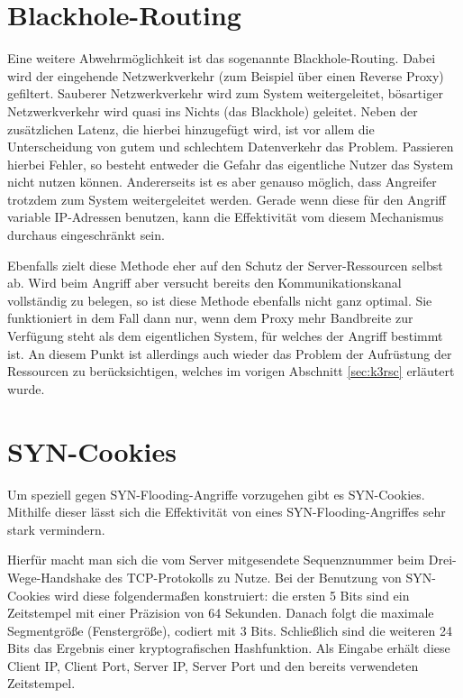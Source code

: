 \section{Blackhole-Routing}
Eine weitere Abwehrmöglichkeit ist das sogenannte Blackhole-Routing. Dabei wird der eingehende Netzwerkverkehr (zum Beispiel über einen Reverse Proxy) gefiltert. \glqq Sauberer\grqq{} Netzwerkverkehr wird zum System weitergeleitet, bösartiger Netzwerkverkehr wird quasi ins Nichts (das Blackhole) geleitet. Neben der zusätzlichen Latenz, die hierbei hinzugefügt wird, ist vor allem die Unterscheidung von gutem und schlechtem Datenverkehr das Problem. Passieren hierbei Fehler, so besteht entweder die Gefahr das eigentliche Nutzer das System nicht nutzen können. Andererseits ist es aber genauso möglich, dass Angreifer trotzdem zum System weitergeleitet werden. Gerade wenn diese für den Angriff variable IP-Adressen benutzen, kann die Effektivität vom diesem Mechanismus durchaus eingeschränkt sein. \cite{CloudflareBlackhole}

Ebenfalls zielt diese Methode eher auf den Schutz der Server-Ressourcen selbst ab. Wird beim Angriff aber versucht bereits den Kommunikationskanal vollständig zu belegen, so ist diese Methode ebenfalls nicht ganz optimal. Sie funktioniert in dem Fall dann nur, wenn dem Proxy mehr Bandbreite zur Verfügung steht als dem eigentlichen System, für welches der Angriff bestimmt ist. An diesem Punkt ist allerdings auch wieder das Problem der Aufrüstung der Ressourcen zu berücksichtigen, welches im vorigen Abschnitt \ref{sec:k3rsc} erläutert wurde.

\section{SYN-Cookies}
Um speziell gegen SYN-Flooding-Angriffe vorzugehen gibt es SYN-Cookies. Mithilfe dieser lässt sich die Effektivität von eines SYN-Flooding-Angriffes sehr stark vermindern.

Hierfür macht man sich die vom Server mitgesendete Sequenznummer beim Drei-Wege-Handshake des TCP-Protokolls zu Nutze. Bei der Benutzung von SYN-Cookies wird diese folgendermaßen konstruiert: die ersten 5 Bits sind ein Zeitstempel mit einer Präzision von 64 Sekunden. Danach folgt die maximale Segmentgröße (Fenstergröße), codiert mit 3 Bits. Schließlich sind die weiteren 24 Bits das Ergebnis einer kryptografischen Hashfunktion. Als Eingabe erhält diese Client IP, Client Port, Server IP, Server Port und den bereits verwendeten Zeitstempel.

